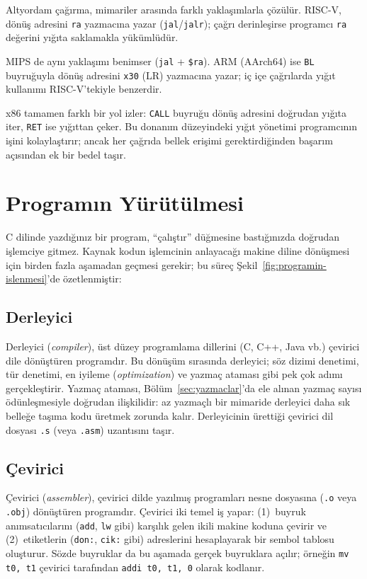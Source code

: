 \begin{karsilastirma}
Altyordam çağırma, mimariler arasında farklı yaklaşımlarla çözülür. RISC-V, dönüş adresini \texttt{ra} yazmacına yazar (\texttt{jal}/\texttt{jalr}); çağrı derinleşirse programcı \texttt{ra} değerini yığıta saklamakla yükümlüdür.

MIPS de aynı yaklaşımı benimser (\texttt{jal} + \texttt{\$ra}). ARM (AArch64) ise \texttt{BL} buyruğuyla dönüş adresini \texttt{x30} (LR) yazmacına yazar; iç içe çağrılarda yığıt kullanımı RISC-V'tekiyle benzerdir.

x86 tamamen farklı bir yol izler: \texttt{CALL} buyruğu dönüş adresini doğrudan yığıta iter, \texttt{RET} ise yığıttan çeker. Bu donanım düzeyindeki yığıt yönetimi programcının işini kolaylaştırır; ancak her çağrıda bellek erişimi gerektirdiğinden başarım açısından ek bir bedel taşır.
\end{karsilastirma}

\section{Programın Yürütülmesi}
\label{sec:program-yurutme}

C dilinde yazdığınız bir program, ``çalıştır'' düğmesine bastığınızda doğrudan işlemciye gitmez. Kaynak kodun işlemcinin anlayacağı makine diline dönüşmesi için birden fazla aşamadan geçmesi gerekir; bu süreç Şekil~\ref{fig:programin-islenmesi}'de özetlenmiştir:

\subsection{Derleyici}
Derleyici (\textit{compiler}), üst düzey programlama dillerini (C, C++, Java vb.) çevirici dile dönüştüren programdır. Bu dönüşüm sırasında derleyici; söz dizimi denetimi, tür denetimi, en iyileme (\textit{optimization}) ve yazmaç ataması gibi pek çok adımı gerçekleştirir. Yazmaç ataması, Bölüm~\ref{sec:yazmaclar}'da ele alınan yazmaç sayısı ödünleşmesiyle doğrudan ilişkilidir: az yazmaçlı bir mimaride derleyici daha sık belleğe taşıma kodu üretmek zorunda kalır. Derleyicinin ürettiği çevirici dil dosyası \texttt{.s} (veya \texttt{.asm}) uzantısını taşır.

\subsection{Çevirici}
Çevirici (\textit{assembler}), çevirici dilde yazılmış programları nesne dosyasına (\texttt{.o} veya \texttt{.obj}) dönüştüren programdır. Çevirici iki temel iş yapar: (1)~buyruk anımsatıcılarını (\texttt{add}, \texttt{lw} gibi) karşılık gelen ikili makine koduna çevirir ve (2)~etiketlerin (\texttt{don:}, \texttt{cik:} gibi) adreslerini hesaplayarak bir sembol tablosu oluşturur. Sözde buyruklar da bu aşamada gerçek buyruklara açılır; örneğin \texttt{mv t0, t1} çevirici tarafından \texttt{addi t0, t1, 0} olarak kodlanır.

